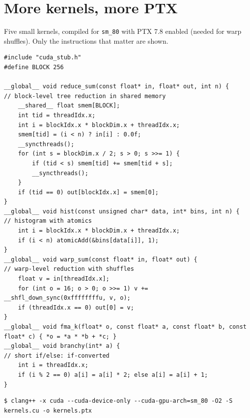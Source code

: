 \documentclass[10pt,a4paper,openany,oneside]{report}
\newcommand{\prio}[1]{\texorpdfstring{\ifcase#1\or{\color{gold}\ding{72}}\or{\color{gold}\ding{72}\ding{72}}\or{\color{gold}\ding{72}\ding{72}\ding{72}}\fi}{}}
\begin{document}
\section{More kernels, more PTX \prio{3}}
Five small kernels, compiled for \texttt{sm\_80} with PTX 7.8 enabled (needed for warp shuffles). Only the instructions that matter are shown.
\begin{lstlisting}[language={CUDA},basicstyle=\ttfamily\scriptsize,title={kernels.cu}]
#include "cuda_stub.h"
#define BLOCK 256

__global__ void reduce_sum(const float* in, float* out, int n) {      // block-level tree reduction in shared memory
    __shared__ float smem[BLOCK];
    int tid = threadIdx.x;
    int i = blockIdx.x * blockDim.x + threadIdx.x;
    smem[tid] = (i < n) ? in[i] : 0.0f;
    __syncthreads();
    for (int s = blockDim.x / 2; s > 0; s >>= 1) {
        if (tid < s) smem[tid] += smem[tid + s];
        __syncthreads();
    }
    if (tid == 0) out[blockIdx.x] = smem[0];
}
__global__ void hist(const unsigned char* data, int* bins, int n) {   // histogram with atomics
    int i = blockIdx.x * blockDim.x + threadIdx.x;
    if (i < n) atomicAdd(&bins[data[i]], 1);
}
__global__ void warp_sum(const float* in, float* out) {               // warp-level reduction with shuffles
    float v = in[threadIdx.x];
    for (int o = 16; o > 0; o >>= 1) v += __shfl_down_sync(0xffffffffu, v, o);
    if (threadIdx.x == 0) out[0] = v;
}
__global__ void fma_k(float* o, const float* a, const float* b, const float* c) { *o = *a * *b + *c; }
__global__ void branchy(int* a) {                                     // short if/else: if-converted
    int i = threadIdx.x;
    if (i % 2 == 0) a[i] = a[i] * 2; else a[i] = a[i] + 1;
}
\end{lstlisting}
\begin{lstlisting}[style=shcmd,basicstyle=\ttfamily\scriptsize]
$ clang++ -x cuda --cuda-device-only --cuda-gpu-arch=sm_80 -O2 -S kernels.cu -o kernels.ptx
\end{lstlisting}
\end{document}
